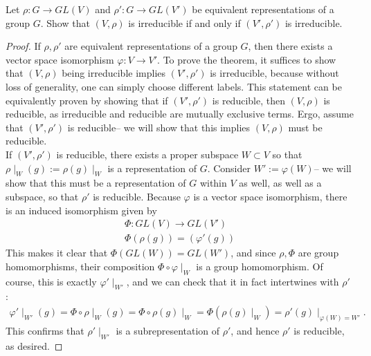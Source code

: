 \documentclass[num=4,duedate=03-03-21,course=Algebra\ II,proflastname=Walton]{hwtemplate}
\begin{document}
\problem[3]
\begin{claim}
	Let \(\rho:G\to GL(V)\) and \(\rho':G\to GL(V')\) be equivalent representations of a group \(G\). Show that \((V,\rho)\) is irreducible if and only if \((V',\rho')\) is irreducible.
\end{claim}
\begin{proof}
	If \(\rho,\rho'\) are equivalent representations of a group \(G\), then there exists a vector space isomorphism \(\varphi:V\to V'\). To prove the theorem, it suffices to show that \((V,\rho)\) being irreducible implies \((V',\rho')\) is irreducible, because without loss of generality, one can simply choose different labels. This statement can be equivalently proven by showing that if \((V',\rho')\) is reducible, then \((V,\rho)\) is reducible, as irreducible and reducible are mutually exclusive terms. Ergo, assume that \((V',\rho')\) is reducible-- we will show that this implies \((V,\rho)\) must be reducible.\\

	If \((V',\rho')\) is reducible, there exists a proper subspace \(W\subset V\) so that \(\rho\mid_W(g) := \rho(g)\mid_W\) is a representation of \(G\). Consider \(W' := \varphi(W)\)-- we will show that this must be a representation of \(G\) within \(V\) as well, as well as a subspace, so that \(\rho'\) is reducible. Because \(\varphi\) is a vector space isomorphism, there is an induced isomorphism given by
	\begin{align*}
		\Phi:GL(V) \to GL(V')\\
		\Phi(\rho(g)) = (\varphi'(g))
	\end{align*}
	This makes it clear that \(\Phi(GL(W)) = GL(W')\), and since \(\rho,\Phi\) are group homomorphisms, their composition \(\Phi\circ\varphi\mid_W\) is a group homomorphism. Of course, this is exactly \(\varphi'\mid_{W'}\), and we can check that it in fact intertwines with \(\rho'\) :
	\begin{align*}
		\varphi'\mid_{W'}(g) = \Phi\circ \rho\mid_W(g) = \Phi\circ \rho(g)\mid_W = \Phi(\rho(g)\mid_W) = \rho'(g)\mid_{\varphi(W)=W'}.
	\end{align*}
	This confirms that \(\rho'\mid_{W'} \) is a subrepresentation of \(\rho'\), and hence \(\rho'\) is reducible, as desired.
\end{proof}
\end{document}
